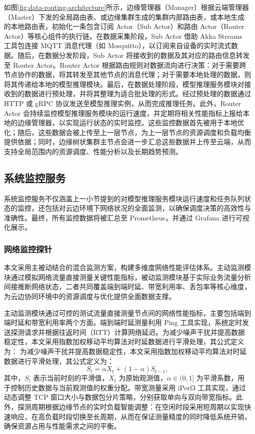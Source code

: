 如图\ref{fig:data-routing-architecture}所示，边缘管理器（Manager）根据云端管理器（Master）下发的全局路由表、或边缘集群生成的集群内部路由表，或本地生成的本地路由表，初始化一条包含订阅 Actor（Sub Actor）和路由 Actor（Router Actor）等核心组件的执行链。在数据采集阶段，Sub Actor 借助 Akka Streams 工具包连接 MQTT 消息代理（如 Mosquitto），以订阅来自设备的实时流式数据。随后，在数据分发阶段，Sub Actor 将接收到的数据及其对应的路由信息转发至 Router Actor。Router Actor 根据路由规则对数据流向进行决策：对于需要跨节点协作的数据，将其转发至其他节点的消息代理；对于需要本地处理的数据，则将其传递给本地的模型推理模块。最后，在数据处理阶段，模型推理服务模块对接收到的数据进行预处理，并将其整理为适合批处理的形式。经过预处理的数据通过 HTTP 或 gRPC 协议发送至模型推理实例，从而完成推理任务。此外，Router Actor 会持续监控模型推理服务模块的运行速度，并定期将相关性能指标上报给本地的边缘管理器，以实现运行状态的实时监控。这些监控数据首先被用于本地优化；随后，这些数据会被上传至上一层节点，为上一层节点的资源调度和负载均衡提供依据；同时，边缘树状集群主节点会进一步汇总这些数据并上传至云端，从而支持全局范围内的资源调度、性能分析以及长期趋势预测。

\subsection{系统监控服务}

系统监控服务不仅涵盖上一小节提到的对模型推理服务模块运行速度和任务队列状态的监控，还包括对云边环境下网络状况的全面监测，以确保调度决策的高效性与准确性。最终，所有监控数据将被汇总至 Prometheus，并通过 Grafana 进行可视化展示。

\subsubsection{网络监控探针}

本文采用主被动结合的混合监测方案，构建多维度网络性能评估体系。主动监测模块通过模拟网络流量直接测量关键性能指标，被动监测模块基于实际业务流量分析间接推断网络状态，二者共同覆盖端到端时延、带宽利用率、丢包率等核心维度，为云边协同环境中的资源调度与优化提供全面数据支撑。

主动监测模块通过可控的测试流量直接测量节点间的网络性能指标，主要包括端到端时延和带宽利用率两个方面。端到端时延测量利用 Ping 工具实现，系统定时发送探测请求并根据往返时间（RTT）计算网络延迟。为减少噪声干扰并提高数据稳定性，本文采用指数加权移动平均算法对时延数据进行平滑处理，其公式定义为：
为减少噪声干扰并提高数据稳定性，本文采用指数加权移动平均算法对时延数据进行平滑处理，其公式定义为：
\[
S_t = \alpha X_t + (1-\alpha)S_{t-1},
\]
其中，$S_t$ 表示当前时刻的平滑值，$X_t$ 为原始观测值，$\alpha \in (0,1]$ 为平滑系数，用于控制历史数据与当前观测值的权重分配。带宽测量采用 iPerf3 工具实现，通过动态调整 TCP 窗口大小与数据包分片策略，分别获取单向与双向带宽指标。此外，探测周期根据边缘节点的实时负载智能调整：在空闲时段采用短周期以实现快速响应，在高负载时段切换至长周期，从而在保证测量精度的同时降低系统开销，确保资源占用与性能需求之间的平衡。

